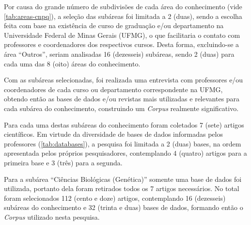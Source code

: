Por causa do grande número de subdivisões de cada área do conhecimento (vide \autoref{tab:areas-cnpq}), a seleção das subáreas foi limitada a 2 (duas), sendo a escolha feita com base na existência de curso de graduação e/ou departamento na Universidade Federal de Minas Gerais (UFMG), o que facilitaria o contato com professores e coordenadores dos respectivos cursos. Desta forma, excluindo-se a área ``Outros'', seriam analisadas 16 (dezesseis) subáreas, sendo 2 (duas) para cada uma das 8 (oito) áreas do conhecimento.

Com as subáreas selecionadas, foi realizada uma entrevista com professores e/ou coordenadores de cada curso ou departamento correspondente na UFMG, obtendo então as bases de dados e/ou revistas mais utilizadas e relevantes para cada subárea do conhecimento, construindo um \emph{Corpus} realmente significativo.

Para cada uma destas subáreas do conhecimento foram coletados 7 (sete) artigos científicos. Em virtude da diversidade de bases de dados informadas pelos professores (\autoref{tab:databases}), a pesquisa foi limitada a 2 (duas) bases, na ordem apresentada pelos próprios pesquisadores, contemplando 4 (quatro) artigos para a primeira base e 3 (três) para a segunda. 

Para a subárea ``Ciências Biológicas (Genética)'' somente uma base de dados foi utilizada, portanto dela foram retirados todos os 7 artigos necessários. No total foram selecionados 112 (cento e doze) artigos, contemplando 16 (dezesseis) subáreas do conhecimento e 32 (trinta e duas) bases de dados, formando então o \emph{Corpus} utilizado nesta pesquisa.

